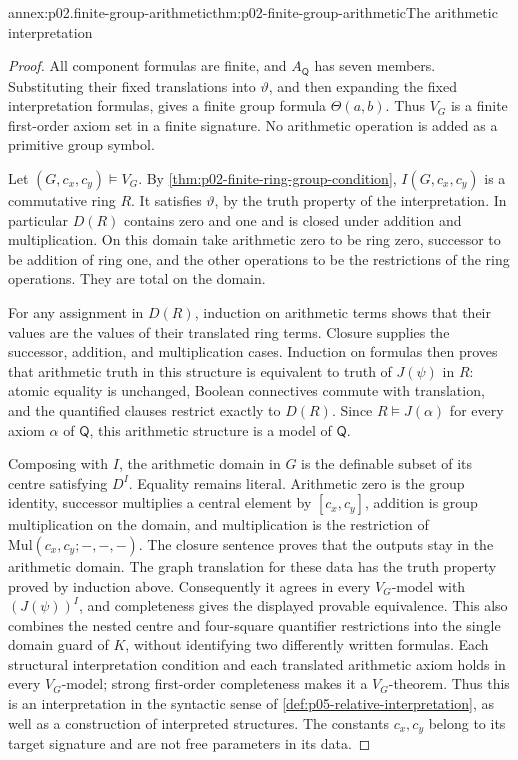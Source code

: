 \begin{annexitem}{annex:p02.finite-group-arithmetic}{thm:p02-finite-group-arithmetic}{The arithmetic interpretation}
\begin{proof}
All component formulas are finite, and \(A_{\mathsf Q}\) has seven
members. Substituting their fixed translations into \(\vartheta\), and
then expanding the fixed interpretation formulas, gives a finite group
formula \(\Theta(a,b)\). Thus \(V_G\) is a finite first-order axiom set
in a finite signature. No arithmetic operation is added as a primitive
group symbol.

Let \((G,c_x,c_y)\models V_G\). By
\cref{thm:p02-finite-ring-group-condition}, \(I(G,c_x,c_y)\) is a
commutative ring \(R\). It satisfies \(\vartheta\), by the truth
property of the interpretation. In particular \(D(R)\) contains
zero and one and is closed under addition and multiplication. On this
domain take arithmetic zero to be ring zero, successor to be addition
of ring one, and the other operations to be the restrictions of the
ring operations. They are total on the domain.

For any assignment in \(D(R)\), induction on arithmetic terms shows
that their values are the values of their translated ring terms.
Closure supplies the successor, addition, and multiplication cases.
Induction on formulas then proves that arithmetic truth in this
structure is equivalent to truth of \(J(\psi)\) in \(R\): atomic
equality is unchanged, Boolean connectives commute with translation,
and the quantified clauses restrict exactly to \(D(R)\).
Since \(R\models J(\alpha)\) for every axiom \(\alpha\) of
\(\mathsf Q\), this arithmetic structure is a model of \(\mathsf Q\).

Composing with \(I\), the arithmetic domain in \(G\) is the definable
subset of its centre satisfying \(D^I\). Equality remains literal.
Arithmetic zero is the group identity, successor multiplies a central
element by \([c_x,c_y]\), addition is group multiplication on the
domain, and multiplication is the restriction of
\(\mathrm{Mul}(c_x,c_y;-,-,-)\). The closure sentence proves that the
outputs stay in the arithmetic domain. The graph translation for these
data has the truth property proved by induction above. Consequently it
agrees in every \(V_G\)-model with \((J(\psi))^I\), and completeness
gives the displayed provable equivalence. This also combines the nested
centre and four-square quantifier restrictions into the single domain
guard of \(K\), without identifying two differently written formulas.
Each structural interpretation condition and each translated arithmetic
axiom holds in every \(V_G\)-model; strong first-order completeness
makes it a \(V_G\)-theorem. Thus this is an interpretation in the
syntactic sense of \cref{def:p05-relative-interpretation}, as well as
a construction of interpreted structures. The constants \(c_x,c_y\)
belong to its target signature and are not free parameters in its data.


\end{proof}
\end{annexitem}
